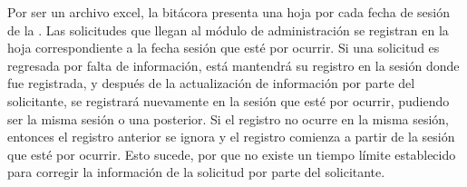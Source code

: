 \noindent Por ser un archivo excel, la bitácora presenta una hoja por cada fecha de sesión de la . Las solicitudes que llegan al módulo de administración se registran en la hoja correspondiente a la fecha sesión que esté por ocurrir. Si una solicitud es regresada por falta de información, está mantendrá su registro en la sesión donde fue registrada, y después de la actualización de información por parte del solicitante, se registrará nuevamente en la sesión que esté por ocurrir, pudiendo ser la misma sesión o una posterior. Si el registro no ocurre en la misma sesión, entonces el registro anterior se ignora y el registro comienza a partir de la sesión que esté por ocurrir. Esto sucede, por que no existe un tiempo límite establecido para corregir la información de la solicitud por parte del solicitante.\\

